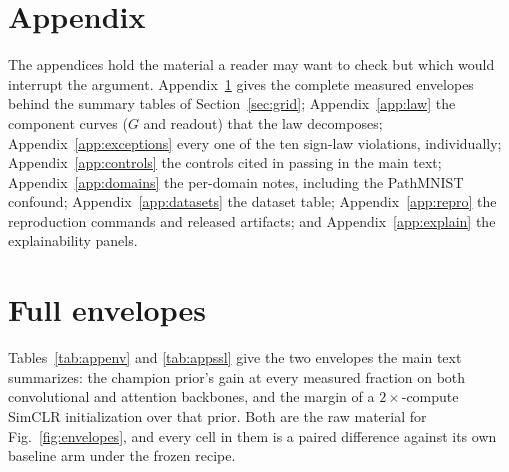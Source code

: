 \appendix

\section*{Appendix}
\noindent The appendices hold the material a reader may want to check but
which would interrupt the argument. Appendix~\ref{app:envelopes} gives the
complete measured envelopes behind the summary tables of
Section~\ref{sec:grid}; Appendix~\ref{app:law} the component curves ($G$
and readout) that the law decomposes; Appendix~\ref{app:exceptions} every
one of the ten sign-law violations, individually; Appendix~\ref{app:controls}
the controls cited in passing in the main text;
Appendix~\ref{app:domains} the per-domain notes, including the PathMNIST
confound; Appendix~\ref{app:datasets} the dataset table;
Appendix~\ref{app:repro} the reproduction commands and released artifacts;
and Appendix~\ref{app:explain} the explainability panels.

\section{Full envelopes}\label{app:envelopes}

Tables~\ref{tab:appenv} and \ref{tab:appssl} give the two envelopes the
main text summarizes: the champion prior's gain at every measured fraction
on both convolutional and attention backbones, and the margin of a
$2\times$-compute SimCLR initialization over that prior. Both are the raw
material for Fig.~\ref{fig:envelopes}, and every cell in them is a paired
difference against its own baseline arm under the frozen recipe.

